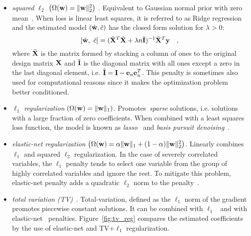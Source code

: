 \begin{itemize}

\item {\it squared $\ell_2$} $\left(\Omega(\mathbf{w}) = \|\mathbf{w}\|^2_2 \right)$ . Equivalent to Gaussian normal prior with zero mean~\citep[Chapter 3]{bishop2006pattern}. When loss is linear least squares, it is referred to as Ridge regression and the estimated model $(\hat{\mathbf{w}}, \hat{c})$ has the closed form solution for $\lambda > 0$:
$$
[\hat{\mathbf{w}},~\hat{c}] = (\tilde{\mathbf{X}}^T \tilde{\mathbf{X}} + \lambda n \tilde{\mathbf{I}})^{-1} \tilde{\mathbf{X}}^T \mathbf{y} \quad,
$$
where $\tilde{\mathbf{X}}$ is the matrix formed by stacking a column of ones to the original design matrix $\mathbf{X}$ and $\tilde{\mathbf{I}}$ is the diagonal matrix with all ones except a zero in the last diagonal element, i.e. $\tilde{\mathbf{I}} = \mathbf{I} - \mathbf{e}_n \mathbf{e}_n^T$. This penalty is sometimes also used for computational reasons since it makes the optimization problem better conditioned.

\item {\it $\ell_1$ regularization} $\left(\Omega(\mathbf{w}) = \|\mathbf{w}\|_1 \right)$. Promotes~\emph{sparse} solutions, i.e. solutions with a large fraction of zero coefficients. When combined with a least squares loss function, the model is known as \emph{lasso}~\citep{tibshirani1996regression} and \emph{basis pursuit denoising}~\citep{chen2001atomic}. 

\item {\it elastic-net regularization} $\left(\Omega(\mathbf{w}) = \alpha \|\mathbf{w}\|_1 + (1 - \alpha) \|\mathbf{w}\|^2_2 \right)$. Linearly combines $\ell_1$ and squared $\ell_2$ regularization. In the case of severely correlated variables, the $\ell_1$ penalty tends to select one variable from the group of highly correlated variables and ignore the rest. To mitigate this problem, elastic-net penalty adds a quadratic $\ell_2$ norm to the penalty~\citep{Zou05regularizationand}.

\item {\it total variation (TV)}~\citep{rudin1992nonlinear, chan1999nonlinear, michel2011total}. Total-variation, defined as the $\ell_1$ norm of the gradient promotes piecewise constant solutions. It can be combined with $\ell_1$~\citep{baldassarre2012structured, gramfort:hal-00839984, dohmatob:hal-00991743} and with elastic-net~\citep{dubois2014predictive} penalties. Figure~\ref{fig:tv_reg} compares the estimated coefficients by the use of elastic-net and TV+$\ell_1$ regularization.

\end{itemize}

